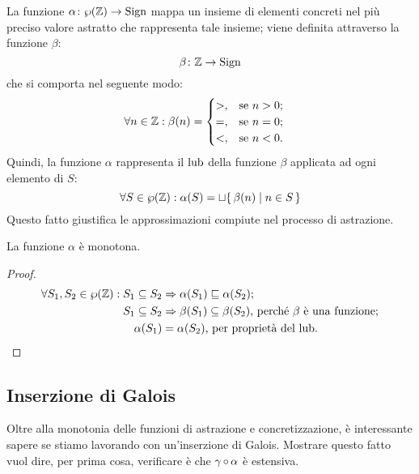 \begin{definizione} 
La funzione $\mathord{\alpha}\colon\wp(\mathbb{Z})\to\mathrm{Sign}$ mappa un insieme
di elementi concreti nel più preciso valore astratto che rappresenta
tale insieme; viene definita attraverso la funzione $\beta$:
\[
        \mathord{\beta}\colon\mathbb{Z}\to\mathrm{Sign}
\]
che si comporta nel seguente modo:
\begin{align*}
        \forall n \in \mathbb{Z} \mathrel{:} \beta(n) &=
        \begin{cases}
                >,      &\text{se $n  >  0$;} \\
                =,      &\text{se $n = 0$;} \\
                <,      &\text{se $n < 0$.}
        \end{cases} 
\end{align*}
Quindi, la funzione $\alpha$ rappresenta il $\mathop{\mathrm{lub}}\nolimits$ della
funzione $\beta$ applicata ad ogni elemento di $S$:
\[
        \forall S \in \wp(\mathbb{Z}) \mathrel{:} \alpha(S) = \sqcup \{\, \beta(n) \mid n \in S \,\}
\]
Questo fatto giustifica le approssimazioni compiute nel processo
di astrazione.
\end{definizione}

\begin{proposizione}
La funzione $\alpha$ è monotona.
\end{proposizione}
\begin{proof}
        \begin{align*}
                \forall S_1, S_2 \in \wp(\mathbb{Z}) \mathrel{:} S_1 \subseteq S_2 &\Rightarrow \alpha(S_1) \sqsubseteq \alpha(S_2)\text{;} \\
                S_1 \subseteq S_2 &\Rightarrow \beta(S_1) \subseteq \beta(S_2) \text{, perché } \beta \text{ è  una funzione;} \\
                \alpha(S_1) &= \alpha(S_2) \text{, per proprietà del lub.}
        \end{align*}
\end{proof}

\subsection{Inserzione di Galois}

Oltre alla monotonia delle funzioni di astrazione e concretizzazione,
è interessante sapere se stiamo lavorando con un'inserzione di Galois.
Mostrare questo fatto vuol dire, per prima cosa,
verificare è che $\mathrm{\gamma}\mathop{\circ}\mathrm{\alpha}$ è estensiva. 

